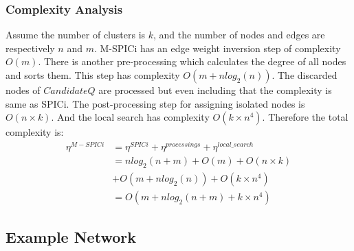 \documentclass[a4paper,twocolumn,preprint]{elsarticle}
\begin{document}
\subsubsection{Complexity Analysis}
Assume the number of clusters is $k$, and the number of nodes and edges are respectively $n$ and $m$. M-SPICi has an edge weight inversion step of complexity $O(m)$. There is another pre-processing which calculates the degree of all nodes and sorts them. This step has complexity $O(m+nlog_2(n))$. The discarded nodes of $CandidateQ$ are processed but even including that the complexity is same as SPICi. The post-processing step for assigning isolated nodes is $O(n\times k)$. And the local search has complexity $O(k\times n^4)$. Therefore the total complexity is:
\begin{equation}
\begin{split}
\eta^{M-SPICi} &= \eta^{SPICi} + \eta^{processings} + \eta^{local\_search}\\
&= nlog_2(n+m)+O(m)+O(n\times k)\\&+O(m+nlog_2(n))+O(k\times n^4)\\
&= O(m+nlog_2(n+m)+k\times n^4)
\end{split}
\end{equation}

\subsection{Example Network}
\end{document}
